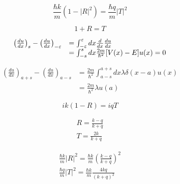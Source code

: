 \documentclass[a4paper,12pt, twoside]{article}
\begin{document}
\begin{equation}
\frac { \hbar k } { m } \left( 1 - | R | ^ { 2 } \right) = \frac { \hbar q } { m } | T | ^ { 2 }
\end{equation}



\begin{equation}
1 + R = T
\end{equation}



\begin{equation}
\begin{array} { r l } { \left( \frac { d u } { d x } \right) _ { s } - \left( \frac { d u } { d x } \right) _ { - \varepsilon } } & { = \int _ { - \varepsilon } ^ { \varepsilon } d x \frac { d } { d x } \frac { d u } { d x } } \\ { } & { = \int _ { - s } ^ { s } d x \frac { 2 m } { \hbar ^ { 2 } } [ V ( x ) - E ] u ( x ) = 0 } \end{array}
\end{equation}




\begin{equation}
\begin{aligned} \left( \frac { d u } { d x } \right) _ { a + s } - \left( \frac { d u } { d x } \right) _ { a - s } & = \frac { 2 m } { \hbar ^ { 2 } } \int _ { a - s } ^ { a + s } d x \lambda \delta ( x - a ) u ( x ) \\ & = \frac { 2 m } { \hbar ^ { 2 } } \lambda u ( a ) \end{aligned}
\end{equation}


\begin{equation}
i k ( 1 - R ) = i q T
\end{equation}


\begin{equation}
\begin{array} { l } { R = \frac { k - q } { k + q } } \\ { T = \frac { 2 k } { k + q } } \end{array}
\end{equation}


\begin{equation}
\begin{array} { l } { \frac { \hbar k } { m } | R | ^ { 2 } = \frac { \hbar k } { m } \left( \frac { k - q } { k + q } \right) ^ { 2 } } \\ { \frac { \hbar q } { m } | T | ^ { 2 } = \frac { \hbar k } { m } \frac { 4 k q } { ( k + q ) ^ { 2 } } } \end{array}
\end{equation}
\end{document}
